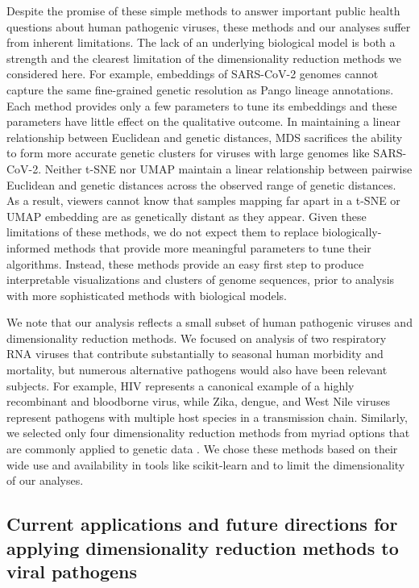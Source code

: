\documentclass[webpdf,contemporary,large,single]{oup-authoring-template}%
\theoremstyle{thmstyleone}%
\theoremstyle{thmstyletwo}%
\theoremstyle{thmstylethree}%
\begin{document}
Despite the promise of these simple methods to answer important public health questions about human pathogenic viruses, these methods and our analyses suffer from inherent limitations.
The lack of an underlying biological model is both a strength and the clearest limitation of the dimensionality reduction methods we considered here.
For example, embeddings of SARS-CoV-2 genomes cannot capture the same fine-grained genetic resolution as Pango lineage annotations.
Each method provides only a few parameters to tune its embeddings and these parameters have little effect on the qualitative outcome.
In maintaining a linear relationship between Euclidean and genetic distances, MDS sacrifices the ability to form more accurate genetic clusters for viruses with large genomes like SARS-CoV-2.
Neither t-SNE nor UMAP maintain a linear relationship between pairwise Euclidean and genetic distances across the observed range of genetic distances.
As a result, viewers cannot know that samples mapping far apart in a t-SNE or UMAP embedding are as genetically distant as they appear.
Given these limitations of these methods, we do not expect them to replace biologically-informed methods that provide more meaningful parameters to tune their algorithms.
Instead, these methods provide an easy first step to produce interpretable visualizations and clusters of genome sequences, prior to analysis with more sophisticated methods with biological models.

We note that our analysis reflects a small subset of human pathogenic viruses and dimensionality reduction methods.
We focused on analysis of two respiratory RNA viruses that contribute substantially to seasonal human morbidity and mortality, but numerous alternative pathogens would also have been relevant subjects.
For example, HIV represents a canonical example of a highly recombinant and bloodborne virus, while Zika, dengue, and West Nile viruses represent pathogens with multiple host species in a transmission chain.
Similarly, we selected only four dimensionality reduction methods from myriad options that are commonly applied to genetic data \citep{Armstrong2022}.
We chose these methods based on their wide use and availability in tools like scikit-learn \citep{Pedregosa2011} and to limit the dimensionality of our analyses.

\subsection{Current applications and future directions for applying dimensionality reduction methods to viral pathogens}
\end{document}
